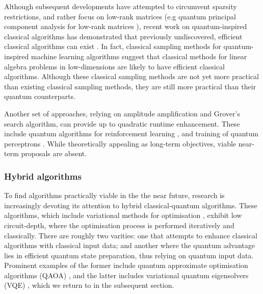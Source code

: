 \documentclass[twocolumn, aps, rmp, amsmath, amssymb, nofootinbib, superscriptaddress, longbibliography, floatfix, table-of-contents, eqsecnum]{revtex4}
\begin{document}
Although subsequent developments have attempted to circumvent sparsity restrictions, and rather focus on low-rank matrices (e.g quantum principal component analysis for low-rank matrices \cite{bib:lloyd2014quantum}), recent work on quantum-inspired classical algorithms has demonstrated that previously undiscovered, efficient classical algorithms can exist \cite{bib:tang2018quantum, bib:gilyen2018quantum, bib:chia2018quantum}. In fact, classical sampling methods \cite{bib:tang2018quantum} for quantum-inspired machine learning algorithms suggest that classical methods for linear algebra problems in low-dimensions are likely to have efficient classical algorithms. Although these classical sampling methods are not yet more practical than existing classical sampling methods, they are still more practical than their quantum counterparts.

Another set of approaches, relying on amplitude amplification and Grover's search algorithm, can provide up to quadratic runtime enhancement. These include quantum algorithms for reinforcement learning \cite{bib:dunjko2016quantum}, and training of quantum perceptrons \cite{bib:kapoor2016quantum}. While theoretically appealing as long-term objectives, viable near-term proposals are absent.

\subsubsection{Hybrid algorithms}

To find algorithms practically viable in the the near future, research is increasingly devoting its attention to hybrid classical-quantum algorithms. These algorithms, which include variational methods for optimisation \cite{bib:moll2018quantum}, exhibit low circuit-depth, where the optimisation process is performed iteratively and classically. There are roughly two varities: one that attempts to enhance classical algorithms with classical input data; and another where the quantum advantage lies in efficient quantum state preparation, thus relying on quantum input data. Prominent examples of the former include quantum approximate optimisation algorithms (QAOA) \cite{bib:farhi2014quantum, bib:farhi2016quantum}, and the latter includes variational quantum eigensolvers (VQE) \cite{bib:peruzzo2014peruzzo, bib:kandala2017hardware}, which we return to in the subsequent section.
\end{document}
